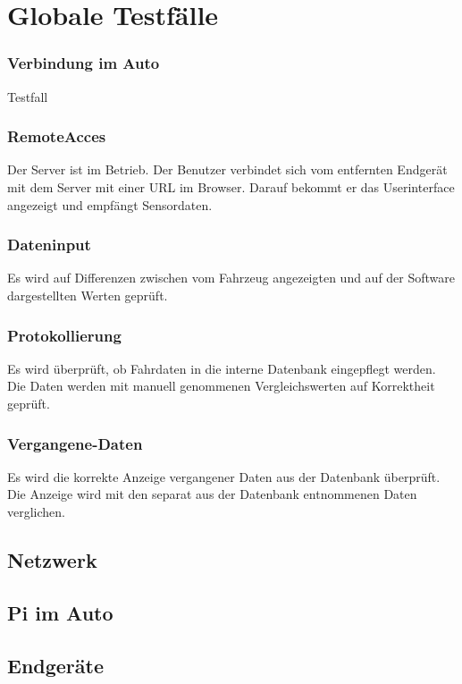 \documentclass[pflichtenheft.tex]{subfiles}
\begin{document}
\chapter{Globale Testfälle}

\subsection{\mkt Verbindung im Auto} Testfall

\subsection{\mkt RemoteAcces} Der Server ist im Betrieb. Der Benutzer verbindet sich vom entfernten Endgerät mit dem Server mit einer URL im Browser. Darauf bekommt er das Userinterface angezeigt und empfängt Sensordaten.

\subsection{\mkt Dateninput} Es wird auf Differenzen zwischen vom Fahrzeug angezeigten und auf der Software dargestellten Werten geprüft.

\subsection{\mkt Protokollierung} Es wird überprüft, ob Fahrdaten in die interne Datenbank eingepflegt werden. Die Daten werden mit manuell genommenen Vergleichswerten auf Korrektheit geprüft.

\subsection{\mkt Vergangene-Daten} Es wird die korrekte Anzeige vergangener Daten aus der Datenbank überprüft. Die Anzeige wird mit den separat aus der Datenbank entnommenen Daten verglichen. 


\section{Netzwerk}
\section{Pi im Auto}
\section{Endgeräte}
\end{document}
